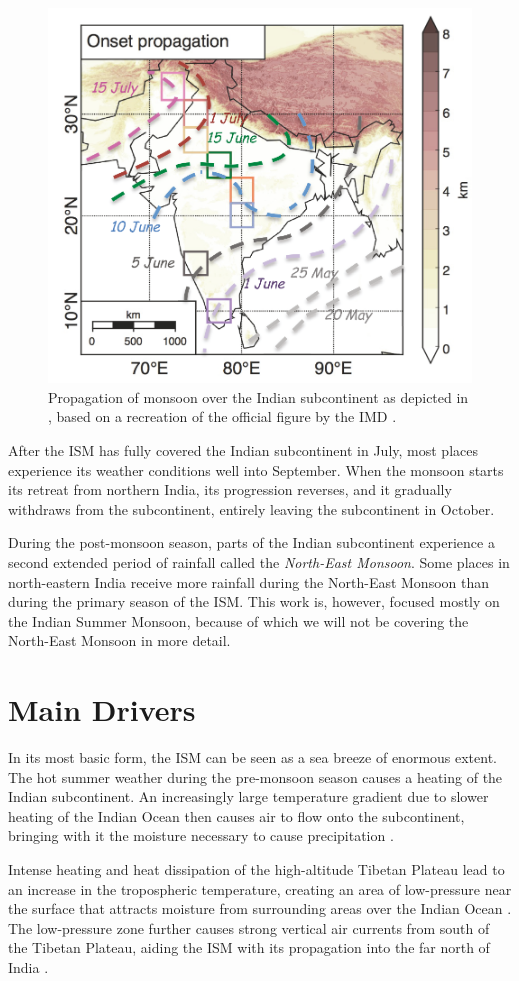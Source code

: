 \begin{figure}[h]
  \centering
  \includegraphics[width=0.45\linewidth]{./99_appendix/img/stolbova_propagation}
  \caption{Propagation of monsoon over the Indian subcontinent as depicted in \citet{Stolbova.2015}, based on a recreation of the official figure by the IMD \citet{IndiaMeteorologicalDepartment.2017b}.}
  \label{fig:onset_propagation}
\end{figure}

After the ISM has fully covered the Indian subcontinent in July, most places experience its weather conditions well into September. When the monsoon starts its retreat from northern India, its progression reverses, and it gradually withdraws from the subcontinent, entirely leaving the subcontinent in October.

During the post-monsoon season, parts of the Indian subcontinent experience a second extended period of rainfall called the \textit{North-East Monsoon}. Some places in north-eastern India receive more rainfall during the North-East Monsoon than during the primary season of the ISM. This work is, however, focused mostly on the Indian Summer Monsoon, because of which we will not be covering the North-East Monsoon in more detail.


\section{Main Drivers}
\label{st:ism_factors}
In its most basic form, the ISM can be seen as a sea breeze of enormous extent. The hot summer weather during the pre-monsoon season causes a heating of the Indian subcontinent. An increasingly large temperature gradient due to slower heating of the Indian Ocean then causes air to flow onto the subcontinent, bringing with it the moisture necessary to cause precipitation \citep{Willetts.2017}.

Intense heating and heat dissipation of the high-altitude Tibetan Plateau lead to an increase in the tropospheric temperature, creating an area of low-pressure near the surface that attracts moisture from surrounding areas over the Indian Ocean \citep{Stolbova.2015}. The low-pressure zone further causes strong vertical air currents from south of the Tibetan Plateau, aiding the ISM with its propagation into the far north of India \citep{Pradhan.2017}.

